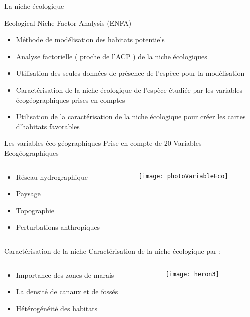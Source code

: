 \documentclass[]{beamer}
\begin{document}
 

 
 \begin{frame}{La niche écologique}
 \begin{block}{Ecological Niche Factor Analysis (ENFA)}
 \begin{itemize}
 \item Méthode de modélisation des habitats potentiels
 \item Analyse factorielle ( proche de l’ACP ) de la niche écologiques
 \item Utilisation des seules données de présence de l’espèce pour la modélisation
  \item Caractérisation de la niche écologique de l’espèce étudiée par les variables écogéographiques prises en comptes
  \item Utilisation de la caractérisation de la niche écologique pour créer les cartes d’habitats favorables 
  \end{itemize}
 \end{block}
 \end{frame}


 
  \begin{frame}{Les variables éco-géographiques}
  Prise en compte de 20 Variables Ecogéographiques
     \vspace{20pt}
   \begin{columns}
    \begin{column}[c]{0.4\textwidth}
 \begin{itemize}[<+->]
  \item  Réseau hydrographique
   \item Paysage
   \item Topographie
   \item Perturbations anthropiques
\end{itemize}
     \end{column}
    \begin{column}[c]{0.6\textwidth}
 \texttt{[image: photoVariableEco]} 
      \end{column}
  \end{columns}
 \end{frame}

 
   \begin{frame}{Caractérisation de la niche}
  Caractérisation de la niche écologique par :
   \vspace{20pt}
   \begin{columns}
    \begin{column}[c]{0.5\textwidth}
 \begin{itemize}[<+->]
  \item  Importance des zones de marais
   \item La densité de canaux et de fossés
   \item Hétérogénéité des habitats
\end{itemize}
     \end{column}
    \begin{column}[c]{0.5\textwidth}
 \texttt{[image: heron3]} 
      \end{column}
  \end{columns}
 \end{frame}
 
\end{document}
